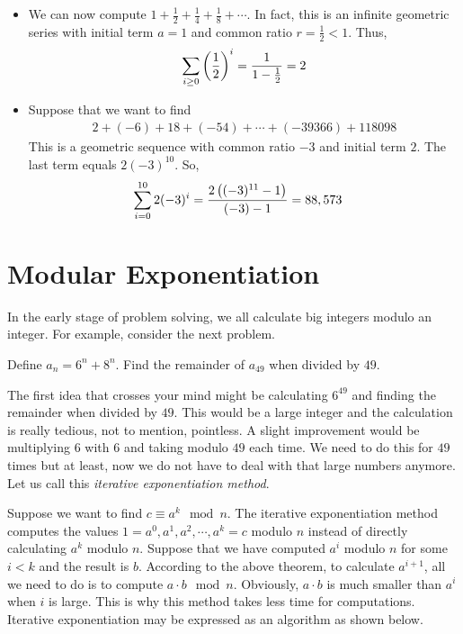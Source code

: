 	\begin{example}
	$ $
		\begin{itemize}
			\item We can now compute $1 + \frac{1}{2}+ \frac{1}{4}+\frac{1}{8}+ \cdots$. In fact, this is an infinite geometric series with initial term $a=1$ and common ratio $r=\frac{1}{2}<1$. Thus,
				\begin{align*}
					\sum_{i\geq0} \left(\frac{1}{2}\right)^i = \dfrac{1}{1-\frac{1}{2}} = 2
				\end{align*}
			\item Suppose that we want to find
				\begin{align*}
					2 + (-6) + 18 + (-54) + \cdots + (-39366) + 118098
				\end{align*}
			This is a geometric sequence with common ratio $-3$ and initial term $2$. The last term equals $2(-3)^{10}$. So,
				\begin{align*}
					\sum_{i=0}^{10} 2(-3)^{i}
						& = \frac{2 \left((-3)^{11} -1\right)}{(-3) - 1} = 88,573
				\end{align*}
		\end{itemize}
	\end{example}
\section{Modular Exponentiation} \label{modexponent}
In the early stage of problem solving, we all calculate big integers modulo an integer. For example, consider the next problem.
	\begin{problem}
		Define $a_n=6^n+8^n$. Find the remainder of $a_{49}$ when divided by $49$.
	\end{problem}
The first idea that crosses your mind might be calculating $6^{49}$ and finding the remainder when divided by $49$. This would be a large integer and the calculation is really tedious, not to mention, pointless. A slight improvement would be multiplying $6$ with $6$ and taking modulo $49$ each time. We need to do this for $49$ times but at least, now we do not have to deal with that large numbers anymore. Let us call this \textit{iterative exponentiation method}.

Suppose we want to find $c \equiv a^k \mod n$. The iterative exponentiation method computes the values $1=a^0, a^1, a^2, \cdots, a^k=c$ modulo $n$ instead of directly calculating $a^k$ modulo $n$. Suppose that we have computed $a^i$ modulo $n$ for some $i<k$ and the result is $b$. According to the above theorem, to calculate $a^{i+1}$, all we need to do is to compute $a\cdot b \mod n$. Obviously, $a \cdot b$ is much smaller than $a^i$ when $i$ is large. This is why this method takes less time for computations. Iterative exponentiation may be expressed as an algorithm as shown below.

